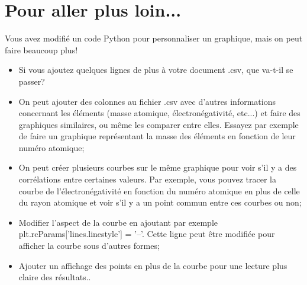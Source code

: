 \section{Pour aller plus loin...}
Vous avez modifié un code Python pour personnaliser un graphique, mais on peut faire beaucoup plus!
\begin{itemize}
\item Si vous ajoutez quelques lignes de plus à votre document .csv, que va-t-il se passer?
\item On peut ajouter des colonnes au fichier .csv avec d'autres informations concernant les éléments (masse atomique, électronégativité, etc...) et faire des graphiques similaires, ou même les comparer entre elles. Essayez par exemple de faire un graphique représentant la masse des éléments en fonction de leur numéro atomique;
\item On peut créer plusieurs courbes sur le même graphique pour voir s'il y a des corrélations entre certaines valeurs. Par exemple, vous pouvez tracer la courbe de l'électronégativité en fonction du numéro atomique en plus de celle du rayon atomique et voir s'il y a un point commun entre ces courbes ou non;
\item Modifier l'aspect de la courbe en ajoutant par exemple {plt.rcParams['lines.linestyle'] = '--'}. Cette ligne peut être modifiée pour afficher la courbe sous d'autres formes;
\item Ajouter un affichage des points en plus de la courbe pour une lecture plus claire des résultats..
\end{itemize}

\vfill


